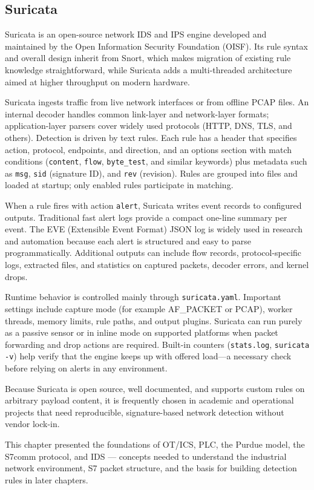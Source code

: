 \documentclass[../main.tex]{subfiles}
\begin{document}
\subsection{Suricata}

Suricata is an open-source network IDS and IPS engine developed and maintained by the Open Information Security Foundation (OISF). Its rule syntax and overall design inherit from Snort, which makes migration of existing rule knowledge straightforward, while Suricata adds a multi-threaded architecture aimed at higher throughput on modern hardware.

Suricata ingests traffic from live network interfaces or from offline PCAP files. An internal decoder handles common link-layer and network-layer formats; application-layer parsers cover widely used protocols (HTTP, DNS, TLS, and others). Detection is driven by text rules. Each rule has a header that specifies action, protocol, endpoints, and direction, and an options section with match conditions (\texttt{content}, \texttt{flow}, \texttt{byte\_test}, and similar keywords) plus metadata such as \texttt{msg}, \texttt{sid} (signature ID), and \texttt{rev} (revision). Rules are grouped into files and loaded at startup; only enabled rules participate in matching.

When a rule fires with action \texttt{alert}, Suricata writes event records to configured outputs. Traditional fast alert logs provide a compact one-line summary per event. The EVE (Extensible Event Format) JSON log is widely used in research and automation because each alert is structured and easy to parse programmatically. Additional outputs can include flow records, protocol-specific logs, extracted files, and statistics on captured packets, decoder errors, and kernel drops.

Runtime behavior is controlled mainly through \texttt{suricata.yaml}. Important settings include capture mode (for example AF\_PACKET or PCAP), worker threads, memory limits, rule paths, and output plugins. Suricata can run purely as a passive sensor or in inline mode on supported platforms when packet forwarding and drop actions are required. Built-in counters (\texttt{stats.log}, \texttt{suricata -v}) help verify that the engine keeps up with offered load---a necessary check before relying on alerts in any environment.

Because Suricata is open source, well documented, and supports custom rules on arbitrary payload content, it is frequently chosen in academic and operational projects that need reproducible, signature-based network detection without vendor lock-in.

This chapter presented the foundations of OT/ICS, PLC, the Purdue model, the S7comm protocol, and IDS --- concepts needed to understand the industrial network environment, S7 packet structure, and the basis for building detection rules in later chapters.
\end{document}
